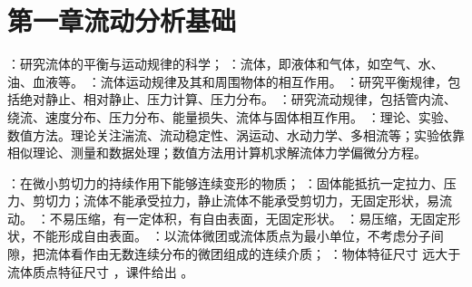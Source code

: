 \section{第一章\quad 流动分析基础}


：研究流体的平衡与运动规律的科学；
：流体，即液体和气体，如空气、水、油、血液等。
：流体运动规律及其和周围物体的相互作用。
：研究平衡规律，包括绝对静止、相对静止、压力计算、压力分布。
：研究流动规律，包括管内流、绕流、速度分布、压力分布、能量损失、流体与固体相互作用。
：理论、实验、数值方法。理论关注湍流、流动稳定性、涡运动、水动力学、多相流等；实验依靠相似理论、测量和数据处理；数值方法用计算机求解流体力学偏微分方程。

\divider


：在微小剪切力的持续作用下能够连续变形的物质；
：固体能抵抗一定拉力、压力、剪切力；流体不能承受拉力，静止流体不能承受剪切力，无固定形状，易流动。
：不易压缩，有一定体积，有自由表面，无固定形状。
：易压缩，无固定形状，不能形成自由表面。
：以流体微团或流体质点为最小单位，不考虑分子间隙，把流体看作由无数连续分布的微团组成的连续介质；
：物体特征尺寸  远大于流体质点特征尺寸 ，课件给出 。

\divider


